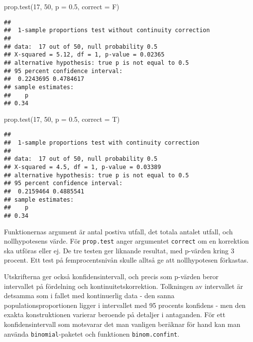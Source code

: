 \documentclass[
]{book}
\newenvironment{Shaded}{\begin{snugshade}}{\end{snugshade}}
\newcommand{\AttributeTok}[1]{\textcolor[rgb]{0.77,0.63,0.00}{#1}}
\newcommand{\DecValTok}[1]{\textcolor[rgb]{0.00,0.00,0.81}{#1}}
\newcommand{\FloatTok}[1]{\textcolor[rgb]{0.00,0.00,0.81}{#1}}
\newcommand{\FunctionTok}[1]{\textcolor[rgb]{0.00,0.00,0.00}{#1}}
\newcommand{\NormalTok}[1]{#1}
\theoremstyle{definition}
\theoremstyle{definition}
\theoremstyle{definition}
\theoremstyle{definition}
\theoremstyle{remark}
\begin{document}
\begin{Shaded}
\begin{Highlighting}[]
\FunctionTok{prop.test}\NormalTok{(}\DecValTok{17}\NormalTok{, }\DecValTok{50}\NormalTok{, }\AttributeTok{p =} \FloatTok{0.5}\NormalTok{, }\AttributeTok{correct =}\NormalTok{ F)}
\end{Highlighting}
\end{Shaded}

\begin{verbatim}
## 
##  1-sample proportions test without continuity correction
## 
## data:  17 out of 50, null probability 0.5
## X-squared = 5.12, df = 1, p-value = 0.02365
## alternative hypothesis: true p is not equal to 0.5
## 95 percent confidence interval:
##  0.2243695 0.4784617
## sample estimates:
##    p 
## 0.34
\end{verbatim}

\begin{Shaded}
\begin{Highlighting}[]
\FunctionTok{prop.test}\NormalTok{(}\DecValTok{17}\NormalTok{, }\DecValTok{50}\NormalTok{, }\AttributeTok{p =} \FloatTok{0.5}\NormalTok{, }\AttributeTok{correct =}\NormalTok{ T)}
\end{Highlighting}
\end{Shaded}

\begin{verbatim}
## 
##  1-sample proportions test with continuity correction
## 
## data:  17 out of 50, null probability 0.5
## X-squared = 4.5, df = 1, p-value = 0.03389
## alternative hypothesis: true p is not equal to 0.5
## 95 percent confidence interval:
##  0.2159464 0.4885541
## sample estimates:
##    p 
## 0.34
\end{verbatim}

Funktionernas argument är antal postiva utfall, det totala antalet utfall, och nollhypotesens värde. För \texttt{prop.test} anger argumentet \texttt{correct} om en korrektion ska utföras eller ej.
De tre testen ger liknande resultat, med p-värden kring 3 procent. Ett test på femprocentsnivån skulle alltså ge att nollhypotesen förkastas.

Utskrifterna ger också konfidensintervall, och precis som p-värden beror intervallet på fördelning och kontinuitetskorrektion. Tolkningen av intervallet är detsamma som i fallet med kontinuerlig data - den sanna populationsproportionen ligger i intervallet med 95 procents konfidens - men den exakta konstruktionen varierar beroende på detaljer i antaganden. För ett konfidensintervall som motsvarar det man vanligen beräknar för hand kan man använda \texttt{binomial}-paketet och funktionen \texttt{binom.confint}.
\end{document}
